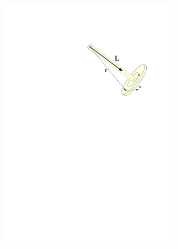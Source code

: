 \documentclass[12pt,final,3p]{elsarticle}
\begin{document}
\begin{figure}[h]
	
	\centering
	\begin{subfigure}{0.25\textwidth}
		\includegraphics[width=\textwidth, keepaspectratio]{figures/gyro3.pdf}
		\label{fig:gyro:def}
	\end{subfigure}\ \ \ \ \ \ 
	\begin{subfigure}{0.32\textwidth}

\end{subfigure}
\end{figure}
\end{document}
